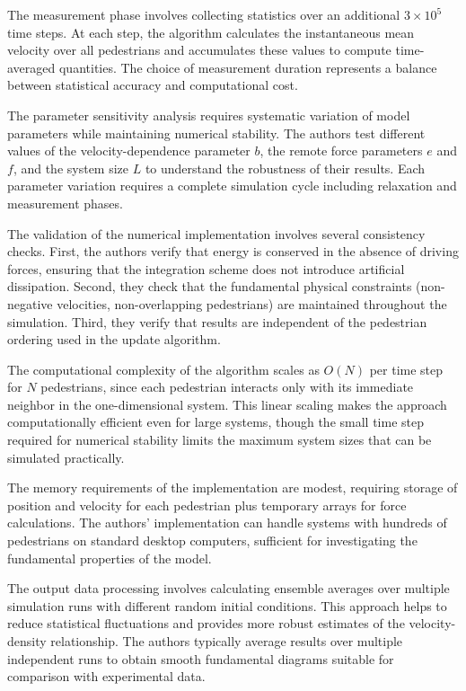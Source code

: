 \documentclass[12pt,a4paper]{article}
\begin{document}
The measurement phase involves collecting statistics over an additional $3 \times 10^5$ time steps. At each step, the algorithm calculates the instantaneous mean velocity over all pedestrians and accumulates these values to compute time-averaged quantities. The choice of measurement duration represents a balance between statistical accuracy and computational cost.

The parameter sensitivity analysis requires systematic variation of model parameters while maintaining numerical stability. The authors test different values of the velocity-dependence parameter $b$, the remote force parameters $e$ and $f$, and the system size $L$ to understand the robustness of their results. Each parameter variation requires a complete simulation cycle including relaxation and measurement phases.

The validation of the numerical implementation involves several consistency checks. First, the authors verify that energy is conserved in the absence of driving forces, ensuring that the integration scheme does not introduce artificial dissipation. Second, they check that the fundamental physical constraints (non-negative velocities, non-overlapping pedestrians) are maintained throughout the simulation. Third, they verify that results are independent of the pedestrian ordering used in the update algorithm.

The computational complexity of the algorithm scales as $O(N)$ per time step for $N$ pedestrians, since each pedestrian interacts only with its immediate neighbor in the one-dimensional system. This linear scaling makes the approach computationally efficient even for large systems, though the small time step required for numerical stability limits the maximum system sizes that can be simulated practically.

The memory requirements of the implementation are modest, requiring storage of position and velocity for each pedestrian plus temporary arrays for force calculations. The authors' implementation can handle systems with hundreds of pedestrians on standard desktop computers, sufficient for investigating the fundamental properties of the model.

The output data processing involves calculating ensemble averages over multiple simulation runs with different random initial conditions. This approach helps to reduce statistical fluctuations and provides more robust estimates of the velocity-density relationship. The authors typically average results over multiple independent runs to obtain smooth fundamental diagrams suitable for comparison with experimental data.
\end{document}
